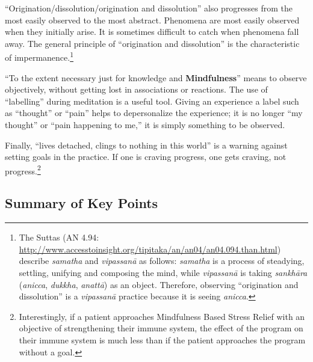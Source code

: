 “Origination/dissolution/origination and dissolution” also progresses from the most easily observed to the most abstract. Phenomena are most easily observed when they initially arise. It is sometimes difficult to catch when phenomena fall away. The general principle of “origination and dissolution” is the characteristic of impermanence.\footnote{The Suttas (AN 4.94: \url{http://www.accesstoinsight.org/tipitaka/an/an04/an04.094.than.html}) describe \textit{samatha} and \textit{vipassanā} as follows: \textit{samatha} is a process of steadying, settling, unifying and composing the mind, while \textit{vipassanā} is taking \textit{sankhāra} (\textit{anicca}, \textit{dukkha}, \textit{anattā}) as an object. Therefore, observing “origination and dissolution” is a \textit{vipassanā} practice because it is seeing \textit{anicca}.}

“To the extent necessary just for knowledge and \textbf{Mindfulness}” means to observe objectively, without getting lost in associations or reactions. The use of “labelling” during meditation is a useful tool. Giving an experience a label such as “thought” or “pain” helps to depersonalize the experience; it is no longer “my thought” or “pain happening to me,” it is simply something to be observed.

Finally, “lives detached, clings to nothing in this world” is a warning against setting goals in the practice. If one is craving progress, one gets craving, not progress.\footnote{Interestingly, if a patient approaches Mindfulness Based Stress Relief with an objective of strengthening their immune system, the effect of the program on their immune system is much less than if the patient approaches the program without a goal.}

\pagebreak

\subsection*{Summary of Key Points}

